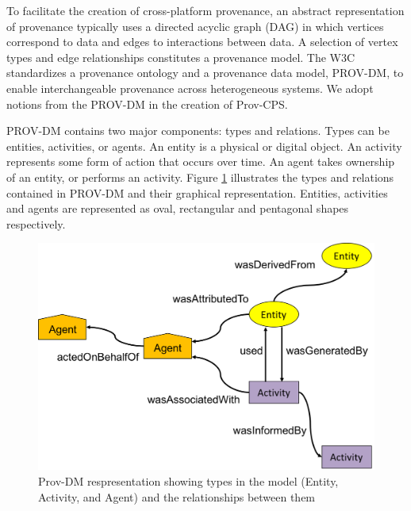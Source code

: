 To facilitate the creation of cross-platform provenance, an abstract representation of provenance typically uses a directed acyclic graph (DAG) in which vertices correspond to data and edges to interactions between data. A selection of vertex types and edge relationships constitutes a provenance model. The W3C standardizes a provenance ontology and a provenance data model, PROV-DM, to enable interchangeable provenance across heterogeneous systems. We adopt notions from the PROV-DM in the creation of Prov-CPS.



\par PROV-DM contains two major components: types and relations.  Types can be entities, activities, or agents. An entity is a physical or digital object. An activity represents some form of action that occurs over time.  An agent takes ownership of an entity, or performs an activity. Figure \ref{prov_rep} illustrates the types and relations contained in PROV-DM and their graphical representation. Entities, activities and agents are represented as oval, rectangular and pentagonal shapes respectively. 


\begin{figure}[h!]
\begin{center}

\includegraphics[width=.6\textwidth]{prov_dm_2.PNG}
\end{center}
\caption{Prov-DM respresentation showing types in the model (Entity, Activity, and Agent) and the relationships between them }
\label{prov_rep}
\end{figure}


